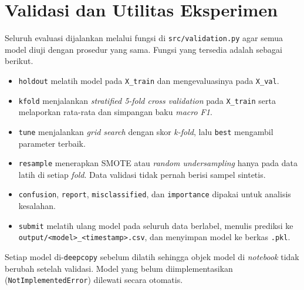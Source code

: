 

\section{Validasi dan Utilitas Eksperimen}

Seluruh evaluasi dijalankan melalui fungsi di \texttt{src/validation.py} agar
semua model diuji dengan prosedur yang sama. Fungsi yang tersedia adalah sebagai
berikut.
\begin{itemize}
	\item \texttt{holdout} melatih model pada \texttt{X\_train} dan mengevaluasinya
	pada \texttt{X\_val}.
	\item \texttt{kfold} menjalankan \textit{stratified 5-fold cross validation}
	pada \texttt{X\_train} serta melaporkan rata-rata dan simpangan baku
	\textit{macro F1}.
	\item \texttt{tune} menjalankan \textit{grid search} dengan skor
	\textit{k-fold}, lalu \texttt{best} mengambil parameter terbaik.
	\item \texttt{resample} menerapkan SMOTE atau
	\textit{random undersampling} hanya pada data latih di setiap \textit{fold}.
	Data validasi tidak pernah berisi sampel sintetis.
	\item \texttt{confusion}, \texttt{report}, \texttt{misclassified}, dan
	\texttt{importance} dipakai untuk analisis kesalahan.
	\item \texttt{submit} melatih ulang model pada seluruh data berlabel, menulis
	prediksi ke \texttt{output/<model>\_<timestamp>.csv}, dan menyimpan model ke
	berkas \texttt{.pkl}.
\end{itemize}
Setiap model di-\texttt{deepcopy} sebelum dilatih sehingga objek model di
\textit{notebook} tidak berubah setelah validasi. Model yang belum
diimplementasikan (\texttt{NotImplementedError}) dilewati secara otomatis.


